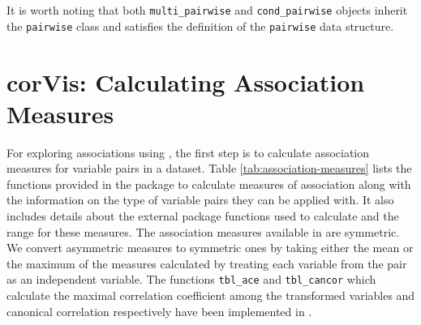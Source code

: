 It is worth noting that both \texttt{multi\_pairwise} and \texttt{cond\_pairwise} objects inherit the \texttt{pairwise} class and satisfies the definition of the \texttt{pairwise} data structure.

\hypertarget{corvis-calculating-association-measures}{%
\section{corVis: Calculating Association Measures}\label{corvis-calculating-association-measures}}

For exploring associations using , the first step is to calculate association measures for variable pairs in a dataset. Table \ref{tab:association-measures} lists the functions provided in the package to calculate measures of association along with the information on the type of variable pairs they can be applied with. It also includes details about the external package functions used to calculate and the range for these measures. The association measures available in  are symmetric. We convert asymmetric measures to symmetric ones by taking either the mean or the maximum of the measures calculated by treating each variable from the pair as an independent variable. The functions \texttt{tbl\_ace} and \texttt{tbl\_cancor} which calculate the maximal correlation coefficient among the transformed variables and canonical correlation respectively have been implemented in .

